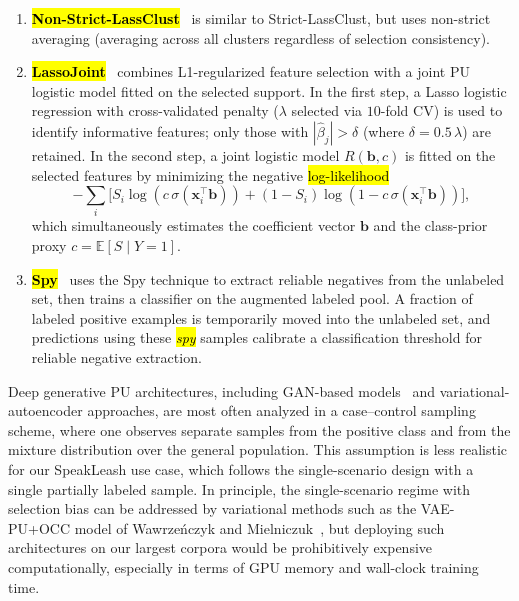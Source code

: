 \documentclass[applsci,article,accept,pdftex,moreauthors]{Definitions/mdpi}
\begin{document}
\begin{enumerate}
\item \textbf{\hl{Non-Strict-LassClust}}~\cite{mdai25_mvc} is similar to Strict-LassClust, but uses non-strict averaging (averaging across all clusters regardless of selection consistency).

\item \textbf{\hl{LassoJoint}}~\cite{lassojoint} combines L1-regularized feature selection with a joint PU logistic model fitted on the selected support. In the first step, a Lasso logistic regression with cross-validated penalty ($\lambda$ selected via $10$-fold CV) is used to identify informative features; only those with $|\hat{\beta}_j| > \delta$ (where $\delta = 0.5\,\lambda$) are retained. In the second step, a joint logistic model $R(\mathbf{b}, c)$ is fitted on the selected features by minimizing the negative \hl{log-likelihood} %
 \[ -\sum_i\bigl[S_i \log(c\,\sigma(\mathbf{x}_i^\top \mathbf{b})) + (1-S_i)\log(1 - c\,\sigma(\mathbf{x}_i^\top \mathbf{b}))\bigr], \] which simultaneously estimates the coefficient vector $\mathbf{b}$ and the class-prior proxy $c = \mathbb{E}[S \mid Y=1]$.

\item \textbf{\hl{Spy}}~\cite{liu2002spy} uses the Spy technique to extract reliable negatives from the unlabeled set, then trains a classifier on the augmented labeled pool. A fraction of labeled positive examples is temporarily moved into the unlabeled set, and predictions using these \emph{\hl{spy}} samples calibrate a classification threshold for reliable negative extraction.
\end{enumerate}

Deep generative PU architectures, including GAN-based models~\cite{hou_genpu} and variational-autoencoder approaches, are most often analyzed in a case--control sampling scheme, where one observes separate samples from the positive class and from the mixture distribution over the general population. This assumption is less realistic for our SpeakLeash use case, which follows the single-scenario design with a single partially labeled sample. In principle, the single-scenario regime with selection bias can be addressed by variational methods such as the VAE-PU+OCC model of Wawrze\'{n}czyk and Mielniczuk~\cite{wawrzenczyk_puvae}, but deploying such architectures on our largest corpora would be prohibitively expensive computationally, especially in terms of GPU memory and wall-clock training time.
\end{document}
